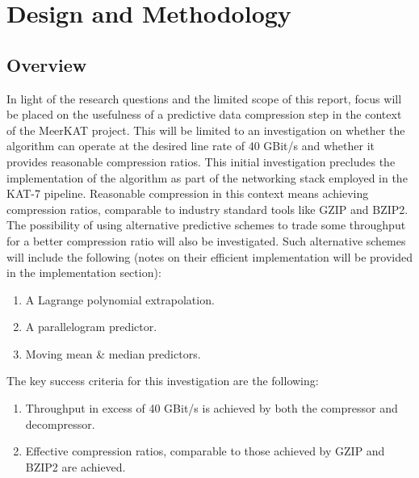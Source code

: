 \section{Design and Methodology}
\subsection{Overview}
In light of the research questions and the limited scope of this report, focus will be placed on the usefulness of a predictive data compression 
step in the context of the MeerKAT project. This will be limited to an investigation on whether the algorithm can operate at the desired line rate of
40 GBit/s and whether it provides reasonable compression ratios. This initial investigation precludes the implementation of the algorithm as part of 
the networking stack employed in the KAT-7 pipeline. Reasonable compression in this context means achieving compression ratios, comparable to industry standard 
tools like GZIP and BZIP2. The possibility of using alternative predictive schemes to trade some throughput for a better compression ratio will also be investigated.
Such alternative schemes will include the following (notes on their efficient implementation will be provided in the implementation section):
\begin{enumerate}
 \item A Lagrange polynomial extrapolation.
 \item A parallelogram predictor.
 \item Moving mean \& median predictors.
\end{enumerate}
The key success criteria for this investigation are the following:
\begin{enumerate}
 \item Throughput in excess of 40 GBit/s is achieved by both the compressor and decompressor.
 \item Effective compression ratios, comparable to those achieved by GZIP and BZIP2 are achieved.
\end{enumerate}

